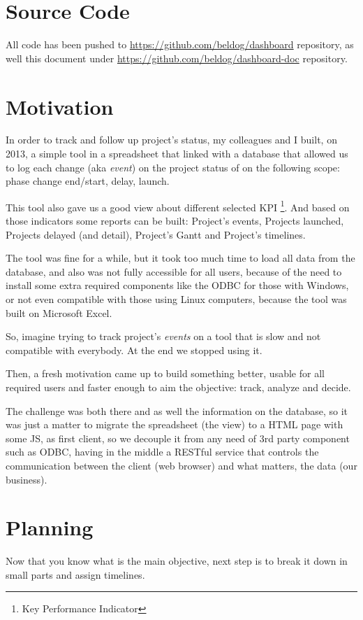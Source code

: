 \documentclass[a4paper,12pt,english]{book}
\begin{document}
\chapter*{Source Code}
All code has been pushed to \url{https://github.com/beldog/dashboard}
repository, as well this document under \url{https://github.com/beldog/dashboard-doc} repository.

\chapter*{Motivation}
In order to track and follow up project's status, my colleagues and I
built, on 2013, a simple tool in a spreadsheet that linked with a database that
allowed us to log each change (aka \emph{event}) on the project status of on
the following scope: phase change end/start, delay, launch.

This tool also gave us a good view about different selected KPI \footnote{Key
Performance Indicator}. And based on those indicators some reports can be
built:
Project's events, Projects launched, Projects delayed (and detail), Project's
Gantt and Project's timelines.

The tool was fine for a while, but it took too much time to load all data
from the database, and also was not fully accessible for all users, because
of the need to install some extra required components like the ODBC for those with
Windows, or not even compatible with those using Linux computers, because the
tool was built on Microsoft Excel.

So, imagine trying to track project's \emph{events} on a tool that is slow
and not compatible with everybody. At the end we stopped using it.

Then, a fresh motivation came up to build something better,
usable for all required users and faster enough to aim the objective: track,
analyze and decide. 

The challenge was both there and as well the information on the database, so it
was just a matter to migrate the spreadsheet (the view) to a HTML page with some JS,
as first client, so we decouple it from any need of 3rd party component such as
ODBC, having in the middle a RESTful service that
controls the communication between the client (web browser) and what matters,
the data (our business).

\chapter*{Planning}
Now that you know what is the main objective, next step is to break it down in
small parts and assign timelines.
\end{document}
